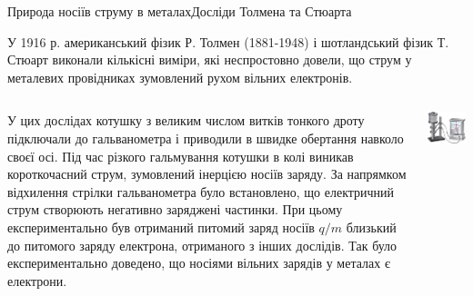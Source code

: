 \documentclass[onlytextwidth]{beamer}
\begin{document}
\begin{frame}{Природа носіїв струму в металах}{Досліди Толмена та Стюарта}\scriptsize
	\begin{block}{}\justifying
		У 1916 р. американський фізик Р. Толмен (1881-1948) і шотландський фізик Т. Стюарт виконали
		кількісні виміри, які неспростовно довели, що струм у металевих провідниках зумовлений рухом
		вільних електронів.
	\end{block}
	\begin{columns}
		\begin{column}{0.65\linewidth}
			\begin{block}{}\justifying
				У цих дослідах котушку з великим числом витків тонкого дроту підключали до гальванометра і
				приводили в швидке обертання навколо своєї осі. Під час різкого гальмування котушки в колі
				виникав короткочасний струм, зумовлений інерцією носіїв заряду. За напрямком відхилення
				стрілки гальванометра було встановлено, що \alert{електричний струм створюють негативно
					заряджені частинки}. При цьому експериментально був отриманий питомий заряд носіїв $q/m$
				близький до питомого заряду електрона, отриманого з інших дослідів. Так було експериментально
				доведено, що носіями вільних зарядів у металах є електрони.
			\end{block}
		\end{column}
		\hfill
		\begin{column}{0.3\linewidth}\centering
			\includegraphics[width=\linewidth]{exptommstuart}

\end{column}
\end{columns}
\end{frame}
\end{document}
